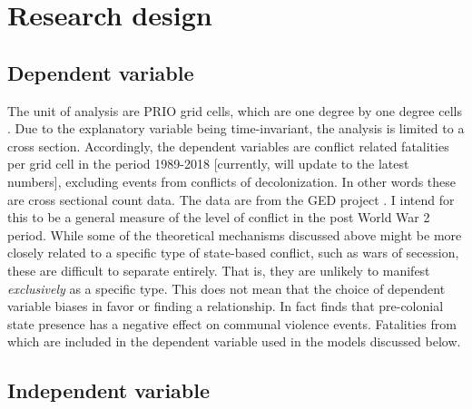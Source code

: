 \documentclass[12pt]{article}
\begin{document}

\section{Research design}

\subsection{Dependent variable}

The unit of analysis are PRIO grid cells, which are one degree by one degree
cells \citep{Tollefsen2012}. Due to the explanatory variable being
time-invariant, the analysis is limited to a cross section. Accordingly, the
dependent variables are conflict related fatalities per grid cell in the period
1989-2018 [currently, will update to the latest numbers], excluding events from
conflicts of decolonization. In other words these are cross sectional count
data. The data are from the GED project \citep{Sundberg2013}. I intend for this
to be a general measure of the level of conflict in the post World War 2 period.
While some of the theoretical mechanisms discussed above might be more closely
related to a specific type of state-based conflict, such as wars of secession,
these are difficult to separate entirely. That is, they are unlikely to manifest
\textit{exclusively} as a specific type. This does not mean that the choice of
dependent variable biases in favor or finding a relationship. In fact
\citet{Wishman2021a} finds that pre-colonial state presence has a negative
effect on communal violence events. Fatalities from which are included in the
dependent variable used in the models discussed below.


\subsection{Independent variable}
\end{document}
